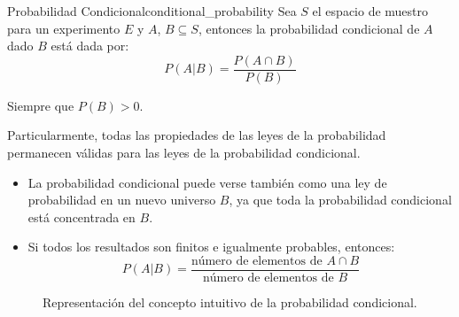 \begin{theorem}{Probabilidad Condicional}{conditional_probability}
Sea $S$ el espacio de muestro para un experimento $E$ y $A$, $B \subseteq S$,
entonces la probabilidad condicional de $A$ dado $B$ está dada por:
    \begin{equation}
        P(A|B) = \frac{P(A \cap B)}{P(B)}
        \label{eq:conditionalProbability}
    \end{equation}

Siempre que $P(B)>0$.

Particularmente, todas las propiedades de las leyes de la probabilidad
permanecen válidas para las leyes de la probabilidad condicional.

\begin{itemize}
    \item La probabilidad condicional puede verse también como una ley de
    probabilidad en un nuevo universo $B$, ya que toda la probabilidad condicional
    está concentrada en $B$.

    \item Si todos los resultados son finitos e igualmente probables, entonces:
        \begin{equation}
            P(A|B)=\frac{\text{número de elementos de }A \cap B}{\text{número de elementos de }B}
        \end{equation}
\end{itemize}
\end{theorem}


\def\firstcircle{(0,0) circle (1.5cm)}
\def\secondcircle{(0:2cm) circle (1.5cm)}
\def\rectangle{(-2,-2) rectangle (4,2)}



\setlength{\parskip}{5mm}

\begin{figure}[h]
    \centering
    \caption{Representación del concepto intuitivo de la probabilidad condicional.}
    \label{fig:coditionalProbability}
\end{figure}

